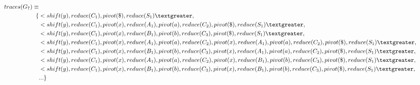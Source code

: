 \documentclass[11pt]{article}
\begin{document}
\begin{align*}
traces(G_7) \equiv \\
\{ & \textless shift(y), reduce(C_1), pivot(\$), reduce(S_1) \textgreater,\\
                      & \textless shift(y), reduce(C_1), pivot(x), reduce(A_1), pivot(a), reduce(C_2), pivot(\$), reduce(S_1) \textgreater,\\
                      & \textless shift(y), reduce(C_1), pivot(x), reduce(B_1), pivot(b), reduce(C_3), pivot(\$), reduce(S_1) \textgreater,\\
                      & \textless shift(y), reduce(C_1), pivot(x), reduce(A_1), pivot(a), reduce(C_2), pivot(x), reduce(A_1), pivot(a), reduce(C_2), pivot(\$), reduce(S_1) \textgreater,\\
                      & \textless shift(y), reduce(C_1), pivot(x), reduce(B_1), pivot(b), reduce(C_3), pivot(x), reduce(A_1), pivot(a), reduce(C_2), pivot(\$), reduce(S_1) \textgreater,\\
                      & \textless shift(y), reduce(C_1), pivot(x), reduce(A_1), pivot(a), reduce(C_2), pivot(x), reduce(B_1), pivot(b), reduce(C_3), pivot(\$), reduce(S_1) \textgreater,\\
                      & \textless shift(y), reduce(C_1), pivot(x), reduce(B_1), pivot(b), reduce(C_3), pivot(x), reduce(B_1), pivot(b), reduce(C_3), pivot(\$), reduce(S_1) \textgreater,\\
                      & ... \}
\end{align*}
\end{document}
